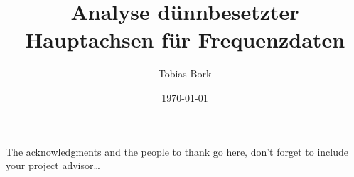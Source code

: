 \documentclass[
11pt, %
ngerman, %
singlespacing, %
parskip, %
headsepline, %
]{MastersDoctoralThesis} %
\author{Tobias Bork}
\date{\today}
\title{Analyse dünnbesetzter Hauptachsen für Frequenzdaten}
\theoremstyle{plain}
\theoremstyle{definition}
\begin{document}
\frontmatter %

\pagestyle{plain} %


\maketitle


\begin{acknowledgements}
\addchaptertocentry{\acknowledgementname} %
The acknowledgments and the people to thank go here, don't forget to include your project advisor\ldots
\end{acknowledgements}


\tableofcontents %





\mainmatter %

\pagestyle{thesis} %











\printbibliography[heading=bibintoc]


\end{document}
